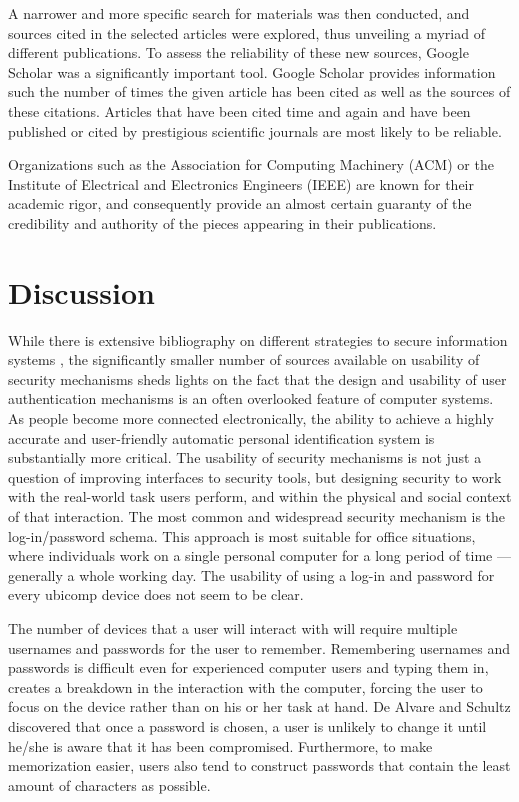 \documentclass{article}
\begin{document}
A narrower and more specific search for materials was then conducted, and sources cited in the selected articles were explored, thus unveiling a myriad of different publications. To assess the reliability of these new sources, Google Scholar was a significantly important tool. Google Scholar provides information such the number of times the given article has been cited as well as the sources of these citations.  Articles that have been cited time and again and have been published or cited by prestigious scientific journals are most likely to be reliable.

Organizations such as the Association for Computing Machinery (ACM) or the Institute of Electrical and Electronics Engineers (IEEE) are known for their academic rigor, and consequently provide an almost certain guaranty of the credibility and authority of the pieces appearing in their publications. 


\section{Discussion}
While there is extensive bibliography on different strategies to secure information systems , the significantly smaller number of sources available on usability of security mechanisms sheds lights on the fact that the design and usability of user authentication mechanisms is an often overlooked feature of computer systems.
As people become more connected electronically, the ability to achieve a highly accurate and user-friendly automatic personal identification system is substantially more critical. \cite{jain2000biometric} The usability of security mechanisms is not just a question of improving interfaces to security tools, but designing security to work with the real-world task users perform, and within the physical and social context of that interaction. 
The most common and widespread security mechanism is the log-in/password schema. This approach is most suitable for office situations, where individuals work on a single personal computer for a long period of time ---generally a whole working day. The usability of using a log-in and password for every ubicomp device does not seem to be clear. 

The number of devices that a user will interact with will require multiple usernames and passwords for the user to remember. Remembering usernames and passwords is difficult even for experienced computer users and typing them in, creates a breakdown in the interaction with the computer, forcing the user to focus on the device rather than on his or her task at hand.  De Alvare and Schultz \cite{dealvare1988framework} discovered that once a password is chosen, a user is unlikely to change it until he/she is aware that it has been compromised. Furthermore, to make memorization easier, users also tend to construct passwords that contain the least amount of characters as possible.
\end{document}
